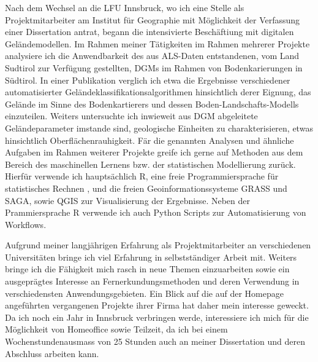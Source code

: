 \documentclass[11pt,a4paper,sans]{moderncv}        %
\begin{document}
Nach dem Wechsel an die LFU Innsbruck, wo ich eine Stelle als Projektmitarbeiter am Institut f\"{u}r Geographie mit M\"{o}glichkeit der Verfassung einer Dissertation antrat, begann die intensivierte Besch\"{a}ftiung mit digitalen Gel\"andemodellen. Im Rahmen meiner T\"{a}tigkeiten im Rahmen mehrerer Projekte analysiere ich die Anwendbarkeit des aus ALS-Daten entstandenen, vom Land Sudtirol zur Verf\"{u}gung gestellten, DGMs im Rahmen von Bodenkarierungen in S\"{u}dtirol. In einer Publikation verglich ich etwa die Ergebnisse verschiedener automatisierter Gel\"{a}ndeklassifikationsalgorithmen hinsichtlich derer Eignung, das Gel\"{a}nde im Sinne des Bodenkartierers und dessen Boden-Landschafts-Modells einzuteilen. Weiters untersuchte ich inwieweit aus DGM abgeleitete Gel\"{a}ndeparameter imstande sind, geologische Einheiten zu charakterisieren, etwas hinsichtlich Oberfl\"{a}chenrauhigkeit. F\"{a}r die genannten Analysen und \"{a}hnliche Aufgaben im Rahmen weiterer Projekte greife ich gerne auf Methoden aus dem Bereich des maschinellen Lernens bzw. der statistischen Modellierung zur\"{u}ck. Hierf\"{u}r verwende ich haupts\"achlich R, eine freie Programmiersprache f\"{u}r statistisches Rechnen , und die freien Geoinformationssysteme  GRASS und SAGA, sowie QGIS zur Visualisierung der Ergebnisse. Neben der Prammiersprache R  verwende ich auch Python Scripts zur Automatisierung von Workflows.

Aufgrund meiner langj\"{a}hrigen Erfahrung als Projektmitarbeiter an verschiedenen Universit\"{a}ten bringe ich viel Erfahrung in selbstst\"{a}ndiger Arbeit mit. Weiters bringe ich die F\"{a}higkeit mich rasch in neue Themen einzuarbeiten sowie ein ausgepr\"{a}gtes Interesse an Fernerkundungsmethoden und deren Verwendung in verschiedensten Anwendungsgebieten. Ein Blick auf die auf der Homepage angef\"{u}hrten vergangenen Projekte ihrer Firma hat daher mein interesse geweckt. Da ich noch ein Jahr in Innsbruck verbringen werde, interessiere ich mich f\"{u}r die M\"{o}glichkeit von Homeoffice sowie Teilzeit, da ich bei einem Wochenstundenausma{ss} von 25 Stunden auch an meiner Dissertation und deren Abschluss arbeiten kann. 
\makeletterclosing

\clearpage


\makecvtitle
\end{document}
